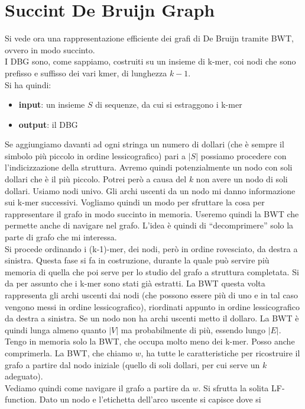 \documentclass[a4paper,12pt, oneside]{book}
\begin{document}
\chapter{Succint De Bruijn Graph}
Si vede ora una rappresentazione efficiente dei grafi di De Bruijn tramite
BWT, ovvero in modo succinto.\\
I DBG sono, come sappiamo, costruiti su un insieme di k-mer, coi nodi che sono
prefisso e suffisso dei vari kmer, di lunghezza $k-1$. \\
Si ha quindi:
\begin{itemize}
  \item \textbf{input}: un insieme $S$ di sequenze, da cui si estraggono i k-mer
  \item \textbf{output}: il DBG
\end{itemize}
Se aggiungiamo davanti ad ogni stringa un numero di dollari (che è sempre il
simbolo più piccolo in ordine lessicografico) pari a $|S|$
possiamo procedere con l'indicizzazione della struttura. Avremo quindi
potenzialmente un nodo con soli dollari che è il più piccolo. Potrei però a
causa del $k$ non avere un nodo di soli dollari. Usiamo nodi univo.
Gli archi uscenti da un nodo mi
danno informazione sui k-mer successivi. Vogliamo quindi un modo per sfruttare
la cosa per rappresentare il grafo in modo succinto in memoria. Useremo quindi
la BWT che permette anche di navigare nel grafo. L'idea è quindi di
``decomprimere'' solo la parte di grafo che mi interessa. \\
Si procede ordinando i (k-1)-mer, dei nodi, però in ordine rovesciato, da destra
a sinistra. Questa fase si fa in costruzione, durante la quale può servire più
memoria di quella che poi serve per lo studio del grafo a struttura
completata. Si da per assunto che i k-mer sono stati già estratti. La BWT questa
volta rappresenta gli archi uscenti dai nodi (che possono essere più di uno e in
tal caso vengono messi in ordine lessicografico), riordinati appunto in ordine
lessicografico da destra a sinistra. Se un nodo non ha archi uscenti metto il
dollaro. La BWT è quindi lunga almeno quanto $|V|$ ma probabilmente di
più, essendo lungo $|E|$. Tengo in memoria solo la BWT, che occupa molto meno
dei k-mer. Posso anche comprimerla. La BWT, che chiamo $w$, ha tutte le
caratteristiche per ricostruire il grafo a partire dal nodo iniziale (quello di
soli dollari, per cui serve un $k$ adeguato). \\
Vediamo quindi come navigare il grafo a partire da $w$. Si sfrutta la solita
LF-function. Dato un nodo e l'etichetta dell'arco uscente si capisce dove si
\end{document}
